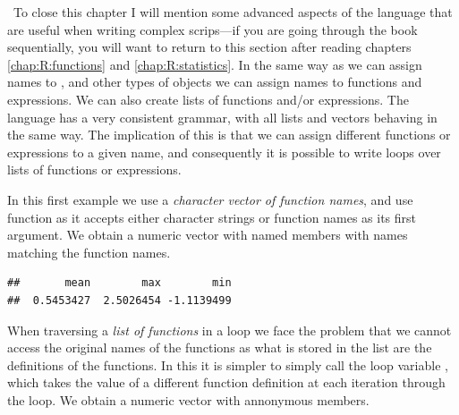 \documentclass[krantz2]{krantz}\usepackage{knitr}%
\begin{document}
\ilAdvanced\ To close this chapter I will mention some advanced aspects of the \Rlang language that are useful when writing complex scrips---if you are going through the book sequentially, you will want to return to this section after reading chapters \ref{chap:R:functions} and \ref{chap:R:statistics}. In the same way as we can assign names to ,  and other types of objects we can assign names to functions and expressions. We can also create lists of functions and/or expressions. The \Rlang language has a very consistent grammar, with all lists and vectors behaving in the same way. The implication of this is that we can assign different functions or expressions to a given name, and consequently it is possible to write loops over lists of functions or expressions.

In this first example we use a \emph{character vector of function names}, and use function  as it accepts either character strings or function names as its first argument. We obtain a numeric vector with named members with names matching the function names.

\begin{knitrout}\footnotesize
{}\color{fgcolor}\begin{kframe}
\begin{alltt}
 \hlkwb{<-} \hlstd{(}\hlstd{)}
 \hlkwb{<-} \hlstd{()}
 \hlkwb{<-} \hlstd{(}\hlstd{,} \hlstd{,} \hlstd{)}
   
    \hlkwb{<-}  
   \hlstd{\}}
\end{alltt}
\begin{verbatim}
##       mean        max        min 
##  0.5453427  2.5026454 -1.1139499
\end{verbatim}
\end{kframe}
\end{knitrout}

When traversing a \emph{list of functions} in a loop we face the problem that we cannot access the original names of the functions as what is stored in the list are the definitions of the functions. In this it is simpler to simply call the loop variable , which takes the value of a different function definition at each iteration through the  loop. We obtain a numeric vector with annonymous members.
\end{document}
